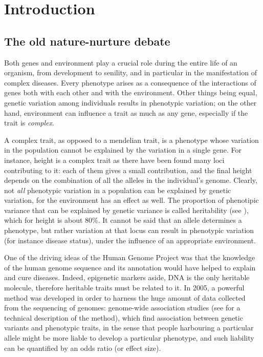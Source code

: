 \documentclass[../main.tex]{subfiles}
\begin{document}
\chapter{Introduction}

\section{The old nature-nurture debate}

Both genes and environment play a crucial role during the entire life of 
an organism, from development to senility, and in particular in the 
manifestation of complex diseases. Every phenotype arises as a 
consequence of the interactions of genes both with each other and with 
the environment. Other things being equal, genetic variation among 
individuals\cite{1000GenomesProjectConsortium2015} results in phenotypic 
variation; on the other hand, environment can influence a trait as much 
as any gene, especially if the trait is \textit{complex}.

A complex trait, as opposed to a mendelian trait, is a phenotype whose 
variation in the population cannot be explained by the variation in a 
single gene. For instance, height is a complex trait as there have been 
found many loci contributing to it: each of them gives a small 
contribution, and the final height depends on the combination of all the 
alleles in the individual's genome. Clearly, not \textit{all} phenotypic 
variation in a population can be explained by genetic variation, for the 
environment has an effect as well. The proportion of phenotipic variance 
that can be explained by genetic variance is called heritability (see 
), which for height is about 
80\%\cite{Visscher2008a}. It cannot be said that an allele determines a 
phenotype, but rather variation at that locus can result in phenotypic 
variation (for instance disease status), under the influence of an 
appropriate environment.

One of the driving ideas of the Human Genome 
Project\cite{Lander2001,Venter2001} was that the knowledge of the human 
genome sequence and its annotation would have helped to explain and cure 
diseases. Indeed, epigenetic markers aside, DNA is the only heritable 
molecule, therefore heritable traits must be related to it. In 2005, a 
powerful method was developed in order to harness the huge amount of 
data collected from the sequencing of genomes: genome-wide association 
studies (see  for a technical description of the method), 
which find association between genetic variants and phenotypic traits, 
in the sense that people harbouring a particular allele might be more 
liable to develop a particular phenotype, and such liability can be 
quantified by an odds ratio (or effect size).
\end{document}
